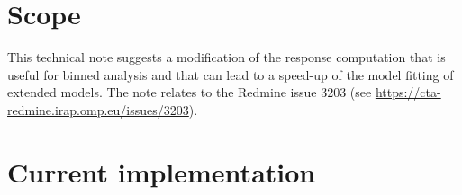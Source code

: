 \documentclass{article}[12pt,a4]
\begin{document}
\frontpage


\section{Scope}

This technical note suggests a modification of the response computation that is useful for binned
analysis and that can lead to a speed-up of the model fitting of extended models.
The note relates to the Redmine issue 3203 (see \url{https://cta-redmine.irap.omp.eu/issues/3203}).


\section{Current implementation}
\end{document}
